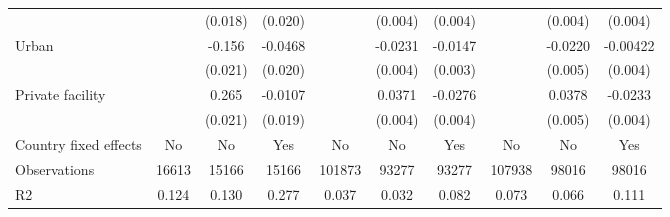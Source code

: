 {\begin{tabular}{l*{9}{c}}
                &                  &  (0.018)         &  (0.020)         &                  &  (0.004)         &  (0.004)         &                  &  (0.004)         &  (0.004)         \\
Urban           &                  &   -0.156\sym{***}&  -0.0468\sym{**} &                  &  -0.0231\sym{***}&  -0.0147\sym{***}&                  &  -0.0220\sym{***}& -0.00422         \\
                &                  &  (0.021)         &  (0.020)         &                  &  (0.004)         &  (0.003)         &                  &  (0.005)         &  (0.004)         \\
Private facility&                  &    0.265\sym{***}&  -0.0107         &                  &   0.0371\sym{***}&  -0.0276\sym{***}&                  &   0.0378\sym{***}&  -0.0233\sym{***}\\
                &                  &  (0.021)         &  (0.019)         &                  &  (0.004)         &  (0.004)         &                  &  (0.005)         &  (0.004)         \\
\hline
Country fixed effects&       No         &       No         &      Yes         &       No         &       No         &      Yes         &       No         &       No         &      Yes         \\
Observations    &    16613         &    15166         &    15166         &   101873         &    93277         &    93277         &   107938         &    98016         &    98016         \\
R2              &    0.124         &    0.130         &    0.277         &    0.037         &    0.032         &    0.082         &    0.073         &    0.066         &    0.111         \\
\hline\hline
\end{tabular}
}
